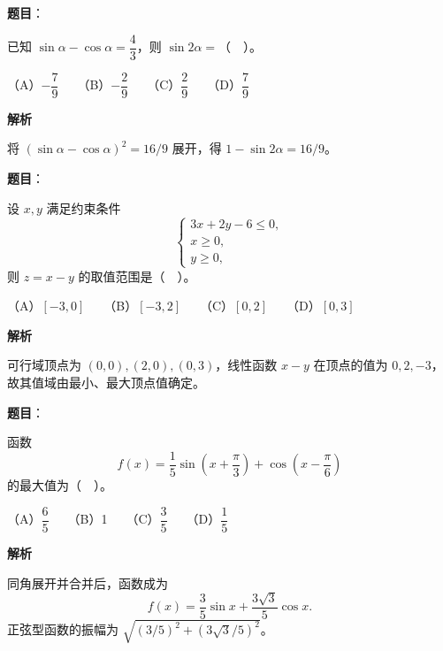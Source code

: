 \begin{answer}

\textbf{题目}：

已知 \(\sin\alpha-\cos\alpha=\dfrac{4}{3}\)，则 \(\sin 2\alpha=\)（　）。

（A）\(-\dfrac{7}{9}\)　　（B）\(-\dfrac{2}{9}\)　　（C）\(\dfrac{2}{9}\)　　（D）\(\dfrac{7}{9}\)

\textbf{解析}

将 \((\sin\alpha-\cos\alpha)^2=16/9\) 展开，得 \(1-\sin2\alpha=16/9\)。


\end{answer}
\begin{answer}

\textbf{题目}：

设 \(x,y\) 满足约束条件
\nopagebreak[4]
\[
\begin{cases}
3x+2y-6\leq 0,\\
x\geq 0,\\
y\geq 0,
\end{cases}
\]
则 \(z=x-y\) 的取值范围是（　）。

（A）\([-3,0]\)　　（B）\([-3,2]\)　　（C）\([0,2]\)　　（D）\([0,3]\)

\textbf{解析}

可行域顶点为 \((0,0),(2,0),(0,3)\)，线性函数 \(x-y\) 在顶点的值为 \(0,2,-3\)，故其值域由最小、最大顶点值确定。


\end{answer}
\begin{answer}

\textbf{题目}：

函数
\nopagebreak[4]
\[
f(x)=\frac{1}{5}\sin\left(x+\frac{\pi}{3}\right)+\cos\left(x-\frac{\pi}{6}\right)
\]
的最大值为（　）。

（A）\(\dfrac{6}{5}\)　　（B）1　　（C）\(\dfrac{3}{5}\)　　（D）\(\dfrac{1}{5}\)

\textbf{解析}

同角展开并合并后，函数成为
\nopagebreak[4]
\[
f(x)=\frac35\sin x+\frac{3\sqrt3}{5}\cos x.
\]
正弦型函数的振幅为 \(\sqrt{(3/5)^2+(3\sqrt3/5)^2}\)。


\end{answer}
